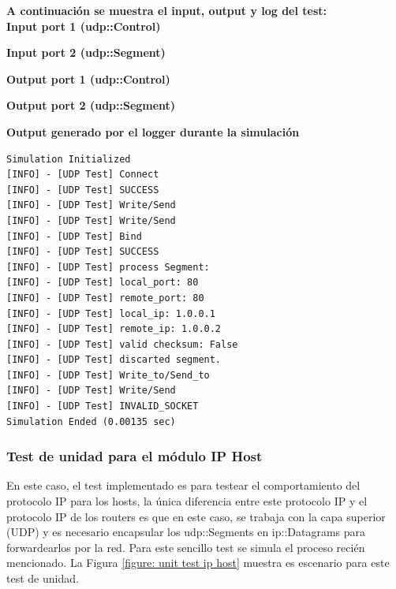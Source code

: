 \documentclass[10pt,a4paper]{article}
\begin{document}
\textbf{A continuación se muestra el input, output y log del test:} \\

\textbf{Input port 1 (udp::Control)}


\textbf{Input port 2 (udp::Segment)}


\textbf{Output port 1 (udp::Control)}


\textbf{Output port 2 (udp::Segment)}


\textbf{Output generado por el logger durante la simulación}
\begin{lstlisting}
Simulation Initialized
[INFO] - [UDP Test] Connect
[INFO] - [UDP Test] SUCCESS
[INFO] - [UDP Test] Write/Send
[INFO] - [UDP Test] Write/Send
[INFO] - [UDP Test] Bind
[INFO] - [UDP Test] SUCCESS
[INFO] - [UDP Test] process Segment: 
[INFO] - [UDP Test] local_port: 80
[INFO] - [UDP Test] remote_port: 80
[INFO] - [UDP Test] local_ip: 1.0.0.1
[INFO] - [UDP Test] remote_ip: 1.0.0.2
[INFO] - [UDP Test] valid checksum: False
[INFO] - [UDP Test] discarted segment.
[INFO] - [UDP Test] Write_to/Send_to
[INFO] - [UDP Test] Write/Send
[INFO] - [UDP Test] INVALID_SOCKET
Simulation Ended (0.00135 sec)
\end{lstlisting}

\subsubsection{Test de unidad para el módulo IP Host}

En este caso, el test implementado es para testear el comportamiento del protocolo IP para los hosts, la única diferencia entre este protocolo IP y el protocolo IP de los routers es que en este caso, se trabaja con la capa superior (UDP) y es necesario encapsular los udp::Segments en ip::Datagrams para forwardearlos por la red. Para este sencillo test se simula el proceso recién mencionado. La Figura \ref{figure: unit test ip host} muestra es escenario para este test de unidad.
\end{document}
